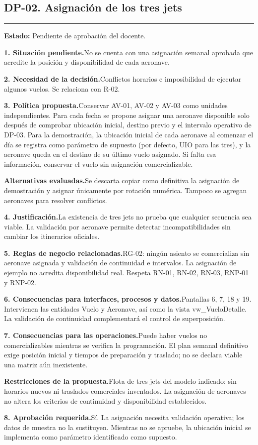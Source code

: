 \documentclass[11pt,a4paper]{article}
\newcommand{\fichacampo}[2]{\noindent\textbf{\color{azulvip}#1}\enspace #2\par\vspace{3pt}}
\begin{document}
\subsection{DP-02. Asignación de los tres jets}
{\color{doradovip}\rule{\textwidth}{.5pt}}
\textbf{Estado:} Pendiente de aprobación del docente.\par\vspace{4pt}
{\normalsize
\fichacampo{1. Situación pendiente.}{No se cuenta con una asignación semanal aprobada que acredite la posición y disponibilidad de cada aeronave.}
\fichacampo{2. Necesidad de la decisión.}{Conflictos horarios e imposibilidad de ejecutar algunos vuelos. Se relaciona con R-02.}
\fichacampo{3. Política propuesta.}{Conservar AV-01, AV-02 y AV-03 como unidades independientes. Para cada fecha se propone asignar una aeronave disponible solo después de comprobar ubicación inicial, destino previo y el intervalo operativo de DP-03. Para la demostración, la ubicación inicial de cada aeronave al comenzar el día se registra como parámetro de supuesto (por defecto, UIO para las tres), y la aeronave queda en el destino de su último vuelo asignado. Si falta esa información, conservar el vuelo sin asignación comercializable.}
\fichacampo{Alternativas evaluadas.}{Se descarta copiar como definitiva la asignación de demostración y asignar únicamente por rotación numérica. Tampoco se agregan aeronaves para resolver conflictos.}
\fichacampo{4. Justificación.}{La existencia de tres jets no prueba que cualquier secuencia sea viable. La validación por aeronave permite detectar incompatibilidades sin cambiar los itinerarios oficiales.}
\fichacampo{5. Reglas de negocio relacionadas.}{RG-02: ningún asiento se comercializa sin aeronave asignada y validación de continuidad e intervalos. La asignación de ejemplo no acredita disponibilidad real. Respeta RN-01, RN-02, RN-03, RNP-01 y RNP-02.}
\fichacampo{6. Consecuencias para interfaces, procesos y datos.}{Pantallas 6, 7, 18 y 19. Intervienen las entidades Vuelo y Aeronave, así como la vista vw\_VueloDetalle. La validación de continuidad complementará el control de superposición.}
\fichacampo{7. Consecuencias para las operaciones.}{Puede haber vuelos no comercializables mientras se verifica la programación. El plan semanal definitivo exige posición inicial y tiempos de preparación y traslado; no se declara viable una matriz aún inexistente.}
\fichacampo{Restricciones de la propuesta.}{Flota de tres jets del modelo indicado; sin horarios nuevos ni traslados comerciales inventados. La asignación de aeronaves no altera los criterios de continuidad y disponibilidad establecidos.}
\fichacampo{8. Aprobación requerida.}{Sí. La asignación necesita validación operativa; los datos de muestra no la sustituyen. Mientras no se apruebe, la ubicación inicial se implementa como parámetro identificado como supuesto.}
}
\clearpage
\end{document}
